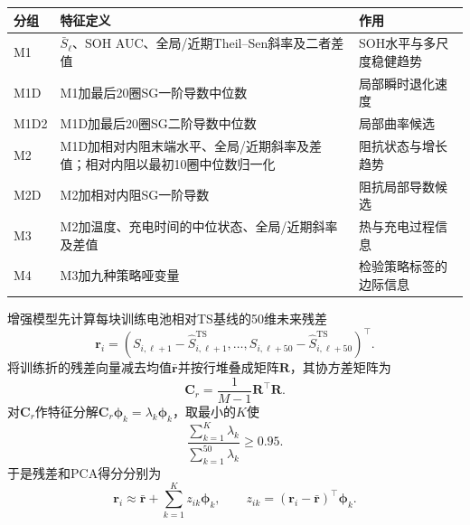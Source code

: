 \documentclass[withoutpreface]{cumcmthesis}
\newcommand{\TS}{\mathrm{TS}}
\begin{document}
\begin{table}[H]
\centering
\small
{}
\begin{tabularx}{\textwidth}{lXl}
\toprule
\rowcolor{TableHeader}
分组 & 特征定义 & 作用 \\
\midrule
M1 & $\bar S_{\ell}$、SOH AUC、全局/近期Theil--Sen斜率及二者差值 & SOH水平与多尺度稳健趋势 \\
M1D & M1加最后20圈SG一阶导数中位数 & 局部瞬时退化速度 \\
M1D2 & M1D加最后20圈SG二阶导数中位数 & 局部曲率候选 \\
M2 & M1D加相对内阻末端水平、全局/近期斜率及差值；相对内阻以最初10圈中位数归一化 & 阻抗状态与增长趋势 \\
M2D & M2加相对内阻SG一阶导数 & 阻抗局部导数候选 \\
M3 & M2加温度、充电时间的中位状态、全局/近期斜率及差值 & 热与充电过程信息 \\
M4 & M3加九种策略哑变量 & 检验策略标签的边际信息 \\
\bottomrule
\end{tabularx}
\label{tab:q3features}
\end{table}

增强模型先计算每块训练电池相对TS基线的50维未来残差
\begin{equation}
\mathbf r_i=
\left(S_{i,\ell+1}-\widehat S_{i,\ell+1}^{\TS},\ldots,
S_{i,\ell+50}-\widehat S_{i,\ell+50}^{\TS}\right)^{\!\top}.
\end{equation}
将训练折的残差向量减去均值$\bar{\mathbf r}$并按行堆叠成矩阵$\mathbf R$，其协方差矩阵为
\begin{equation}
\mathbf C_r=\frac{1}{M-1}\mathbf R^{\top}\mathbf R.
\end{equation}
对$\mathbf C_r$作特征分解$\mathbf C_r\boldsymbol\phi_k=\lambda_k\boldsymbol\phi_k$，取最小的$K$使
\begin{equation}
\frac{\sum_{k=1}^{K}\lambda_k}{\sum_{k=1}^{50}\lambda_k}\ge0.95.
\end{equation}
于是残差和PCA得分分别为
\begin{equation}
\mathbf r_i\approx\bar{\mathbf r}+\sum_{k=1}^{K}z_{ik}\boldsymbol\phi_k,
\qquad
z_{ik}=(\mathbf r_i-\bar{\mathbf r})^{\top}\boldsymbol\phi_k.
\end{equation}
\end{document}
